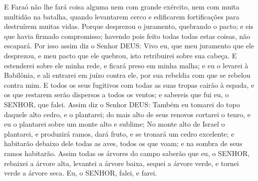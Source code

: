 {  E Faraó não lhe fará coisa alguma nem com grande exército, nem com muita multidão na batalha, quando levantarem cerco e edificarem fortificações para destruírem muitas vidas.
  Porque desprezou o juramento, quebrando o pacto; e eis que havia firmado compromisso; havendo pois feito todas todas estas coisas, não escapará.
  Por isso assim diz o Senhor DEUS: Vivo eu, que meu juramento que ele desprezou, e meu pacto que ele quebrou, isto retribuirei sobre sua cabeça.
  E estenderei sobre ele minha rede, e ficará preso em minha malha; e eu o levarei à Babilônia, e ali entrarei em juízo contra ele, por sua rebeldia com que se rebelou contra mim.
  E todos os seus fugitivos com todas as suas tropas cairão à espada, e os que restarem serão dispersos a todos os ventos; e sabereis que fui eu, o SENHOR, que falei.
  Assim diz o Senhor DEUS: Também eu tomarei do topo daquele alto cedro, e o plantarei; do mais alto de seus renovos cortarei o
{} tenro, e eu o plantarei sobre um monte alto e sublime;
  No monte alto de Israel o plantarei, e produzirá ramos, dará fruto, e se tronará um cedro excelente; e habitarão debaixo dele todas as aves, todos os que voam; e na sombra de seus ramos habitarão.
  Assim todas os árvores do campo saberão que eu, o SENHOR, rebaixei a árvore alta, levantei a árvore baixa, sequei a árvore verde, e tornei verde a árvore seca. Eu, o SENHOR, falei, e farei.
\par }

